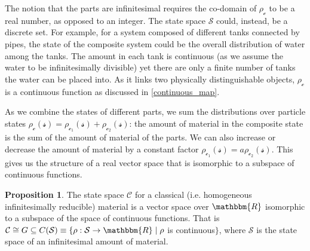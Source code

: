 \documentclass[aps,pra,10pt,twocolumn,floatfix,nofootinbib]{revtex4-1}
\numberwithin{equation}{section}
\theoremstyle{definition}
\newtheorem{prop}[equation]{Proposition}
\begin{document}
The notion that the parts are infinitesimal requires the co-domain of $\rho_\mathcal{c}$ to be a real number, as opposed to an integer. The state space $\mathcal{S}$ could, instead, be a discrete set. For example, for a system composed of different tanks connected by pipes, the state of the composite system could be the overall distribution of water among the tanks. The amount in each tank is continuous (as we assume the water to be infinitesimally divisible) yet there are only a finite number of tanks the water can be placed into. As it links two physically distinguishable objects, $\rho_\mathcal{c}$ is a continuous function as discussed in \ref{continuous_map}.

As we combine the states of different parts, we sum the distributions over particle states $\rho_{\mathcal{c}}(\mathcal{s})=\rho_{\mathcal{c}_1}(\mathcal{s})+\rho_{\mathcal{c}_2}(\mathcal{s})$: the amount of material in the composite state is the sum of the amount of material of the parts. We can also increase or decrease the amount of material by a constant factor $\rho_{\mathcal{c}_1}(\mathcal{s})=a\rho_{\mathcal{c}_2}(\mathcal{s})$. This gives us the structure of a real vector space that is isomorphic to a subspace of continuous functions.

\begin{prop}\label{classical_vector space}
The state space $\mathcal{C}$ for a classical (i.e. homogeneous infinitesimally reducible) material is a vector space over $\mathbbm{R}$ isomorphic to a subspace of the space of continuous functions. That is $\mathcal{C} \cong G \subseteq C(\mathcal{S}) \equiv \{\rho:\mathcal{S} \rightarrow \mathbbm{R} \; | \; \rho$ is continuous$\}$, where $\mathcal{S}$ is the state space of an infinitesimal amount of material.
\end{prop}
\end{document}

